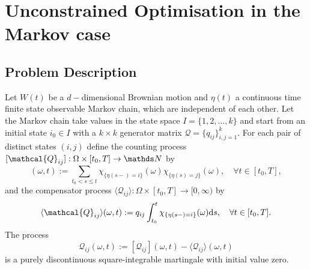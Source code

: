 \section{Unconstrained Optimisation in the Markov case}
\subsection{Problem Description}
Let $W(t)$ be a $d-$dimensional Brownian motion and $\eta(t)$ a continuous time finite state observable Markov chain, which are independent of each other. Let the Markov chain take values in the state space $I = \{ 1, 2, \dots, k\}$ and start from an initial state $i_0 \in I$ with a $k \times k$ generator matrix $\mathcal{Q} = \{ {q}_{i j} \}_{i,j = 1}^k$. For each pair of distinct states $(i,j)$ define the counting process $[\mathcal{Q}_{ij}] : \Omega \times [t_0, T] \to \N$ by
\begin{equation*}
    [\mathcal{Q}_{ij}](\omega, t):= \sum_{t_0 < s \le t} \chi_{ \{\eta(s-) = i\}}(\omega) \chi_{\{ \eta(s) = j \}}(\omega), \quad \forall t \in [t_0, T],
\end{equation*}
and the compensator process $\langle \mathcal{Q}_{ij} \rangle: \Omega \times [t_0, T] \to [0, \infty)$ by
\begin{equation*}
    \langle \mathcal{Q}_{ij} \rangle (\omega, t) := q_{ij} \int_{t_0}^t \chi_{\{ \eta(s-)=i \}}(\omega) \d s, \quad \forall t \in [t_0, T].
\end{equation*}
The process
\begin{equation*}
    \mathcal{Q}_{ij}(\omega, t) := [\mathcal{Q}_{ij}](\omega, t) - \langle \mathcal{Q}_{ij} \rangle (\omega, t)
\end{equation*}
is a purely discontinuous square-integrable martingale with initial value zero.\\

